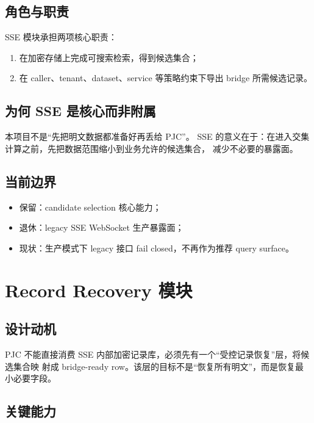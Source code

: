 \documentclass[UTF8,a4paper,12pt,oneside]{ctexrep}
\begin{document}
\subsection{角色与职责}

SSE 模块承担两项核心职责：

\begin{enumerate}
  \item 在加密存储上完成可搜索检索，得到候选集合；
  \item 在 caller、tenant、dataset、service 等策略约束下导出 bridge 所需候选记录。
\end{enumerate}

\subsection{为何 SSE 是核心而非附属}

本项目不是“先把明文数据都准备好再丢给 PJC”。  
SSE 的意义在于：在进入交集计算之前，先把数据范围缩小到业务允许的候选集合，
减少不必要的暴露面。

\subsection{当前边界}

\begin{itemize}
  \item 保留：candidate selection 核心能力；
  \item 退休：legacy SSE WebSocket 生产暴露面；
  \item 现状：生产模式下 legacy 接口 fail closed，不再作为推荐 query surface。
\end{itemize}

\section{Record Recovery 模块}

\subsection{设计动机}

PJC 不能直接消费 SSE 内部加密记录库，必须先有一个“受控记录恢复”层，将候选集合映
射成 bridge-ready row。该层的目标不是“恢复所有明文”，而是恢复最小必要字段。

\subsection{关键能力}
\end{document}
